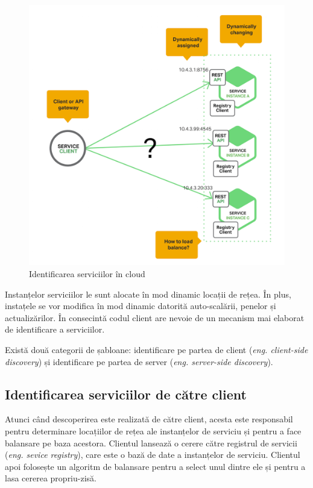 \documentclass[12pt, a4paper, oneside, romanian]{teza-upb}
\begin{document}
\begin{figure}[ht]
\centering
\includegraphics[scale=0.3]{img/Richardson-microservices-part4-1_difficult-service-discovery.png}
\caption{Identificarea serviciilor în cloud}
\label{fig:arhi_componente}
\end{figure}

Instanțelor serviciilor le sunt alocate în mod dinamic locații de rețea.  În plus, instațele se vor modifica în mod dinamic datorită auto-scalării, penelor și actualizărilor. În  consecintă codul client are nevoie de un mecanism mai elaborat de identificare a serviciilor. 

Există două categorii de șabloane: identificare pe partea de client (\textit{eng. client-side discovery}) și identificare pe partea de server (\textit{eng. server-side discovery}).

\subsection{Identificarea serviciilor de către client}

Atunci când descoperirea este realizată de către client, acesta este responsabil pentru determinare locațiilor de rețea ale instanțelor de serviciu și pentru a face balansare pe baza acestora. Clientul lansează o cerere către registrul de servicii (\textit{eng. sevice registry}), care este o bază de date a instanțelor de serviciu. Clientul apoi folosește un algoritm de balansare pentru a select unul dintre ele și pentru a lasa cererea propriu-zisă. 
\end{document}
